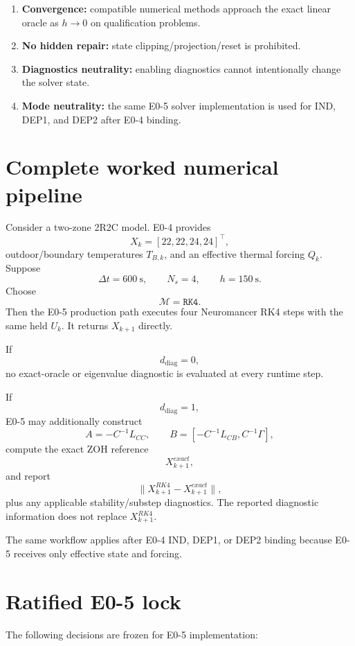 \documentclass[11pt]{article}
\newcommand{\diagmode}{d_{\mathrm{diag}}}
\begin{document}
\begin{enumerate}[leftmargin=*]
\item \textbf{Convergence:} compatible numerical methods approach the exact
linear oracle as $h\to0$ on qualification problems.

\item \textbf{No hidden repair:} state clipping/projection/reset is prohibited.

\item \textbf{Diagnostics neutrality:} enabling diagnostics cannot intentionally
change the solver state.

\item \textbf{Mode neutrality:} the same E0-5 solver implementation is used for
IND, DEP1, and DEP2 after E0-4 binding.
\end{enumerate}

\section{Complete worked numerical pipeline}

Consider a two-zone 2R2C model. E0-4 provides
\[
X_k=[22,22,24,24]^\top,
\]
outdoor/boundary temperatures $T_{B,k}$, and an effective thermal forcing
$Q_k$. Suppose
\[
\Delta t=600\ \mathrm s,
\qquad
N_s=4,
\qquad
h=150\ \mathrm s.
\]
Choose
\[
\mathcal M=\texttt{RK4}.
\]
Then the E0-5 production path executes four Neuromancer RK4 steps with the same
held $U_k$. It returns $X_{k+1}$ directly.

If
\[
\diagmode=0,
\]
no exact-oracle or eigenvalue diagnostic is evaluated at every runtime step.

If
\[
\diagmode=1,
\]
E0-5 may additionally construct
\[
A=-C^{-1}L_{CC},
\qquad
B=[-C^{-1}L_{CB},C^{-1}\Gamma],
\]
compute the exact ZOH reference
\[
X_{k+1}^{exact},
\]
and report
\[
\|X_{k+1}^{RK4}-X_{k+1}^{exact}\|,
\]
plus any applicable stability/substep diagnostics. The reported diagnostic
information does not replace $X_{k+1}^{RK4}$.

The same workflow applies after E0-4 IND, DEP1, or DEP2 binding because E0-5
receives only effective state and forcing.

\section{Ratified E0-5 lock}

The following decisions are frozen for E0-5 implementation:
\end{document}
